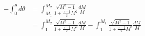 \documentclass[10pt]{article}
\begin{document}
\begin{align*}- \int_{0}^{\theta} d \theta
&=
\int_{M_1}^{M_2} \frac{ \sqrt{M^2-1} }{1 + \frac{\gamma-1}{2} M^2 } \frac{dM}{M} \\
&=
\int_{1}^{M_2} \frac{ \sqrt{M^2-1} }{1 + \frac{\gamma-1}{2} M^2 } \frac{dM}{M}
-
\int_{1}^{M_1} \frac{ \sqrt{M^2-1} }{1 + \frac{\gamma-1}{2} M^2 } \frac{dM}{M}


\end{align*}
\end{document}
